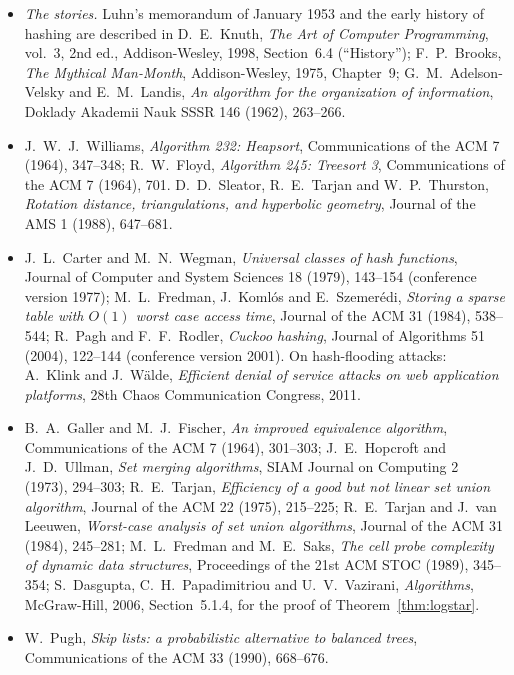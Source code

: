 \begin{itemize}
\item \emph{The stories.} Luhn's memorandum of January 1953 and the early history of hashing are described in D.~E.~Knuth, \emph{The Art of Computer Programming}, vol.~3, 2nd ed.,
Addison-Wesley, 1998, Section~6.4 (``History''); F.~P.~Brooks, \emph{The Mythical Man-Month}, Addison-Wesley, 1975, Chapter~9; G.~M.~Adelson-Velsky and E.~M.~Landis, \emph{An
algorithm for the organization of information}, Doklady Akademii Nauk SSSR 146 (1962), 263--266.
\item J.~W.~J.~Williams, \emph{Algorithm 232: Heapsort}, Communications of the ACM 7 (1964), 347--348; R.~W.~Floyd, \emph{Algorithm 245: Treesort 3}, Communications of the ACM 7 (1964), 701.
D.~D.~Sleator, R.~E.~Tarjan and W.~P.~Thurston, \emph{Rotation distance, triangulations, and hyperbolic geometry}, Journal of the AMS 1 (1988), 647--681.
\item J.~L.~Carter and M.~N.~Wegman, \emph{Universal classes of hash functions}, Journal of Computer and System Sciences 18 (1979), 143--154 (conference version 1977); M.~L.~Fredman,
J.~Koml\'os and E.~Szemer\'edi, \emph{Storing a sparse table with $O(1)$ worst case access time}, Journal of the ACM 31 (1984), 538--544; R.~Pagh and F.~F.~Rodler, \emph{Cuckoo hashing},
Journal of Algorithms 51 (2004), 122--144 (conference version 2001). On hash-flooding attacks: A.~Klink and J.~W\"alde, \emph{Efficient denial of service attacks on web application platforms},
28th Chaos Communication Congress, 2011.
\item B.~A.~Galler and M.~J.~Fischer, \emph{An improved equivalence algorithm}, Communications of the ACM 7 (1964), 301--303; J.~E.~Hopcroft and J.~D.~Ullman, \emph{Set merging algorithms}, SIAM Journal on
Computing 2 (1973), 294--303; R.~E.~Tarjan, \emph{Efficiency of a good but not linear set union algorithm}, Journal of the ACM 22 (1975), 215--225; R.~E.~Tarjan and J.~van Leeuwen, \emph{Worst-case analysis
of set union algorithms}, Journal of the ACM 31 (1984), 245--281; M.~L.~Fredman and M.~E.~Saks, \emph{The cell probe complexity of dynamic data structures}, Proceedings of the 21st ACM STOC (1989), 345--354;
S.~Dasgupta, C.~H.~Papadimitriou and U.~V.~Vazirani, \emph{Algorithms}, McGraw-Hill, 2006, Section~5.1.4, for the proof of Theorem~\ref{thm:logstar}.
\item W.~Pugh, \emph{Skip lists: a probabilistic alternative to balanced trees}, Communications of the ACM 33 (1990), 668--676.
\end{itemize}
